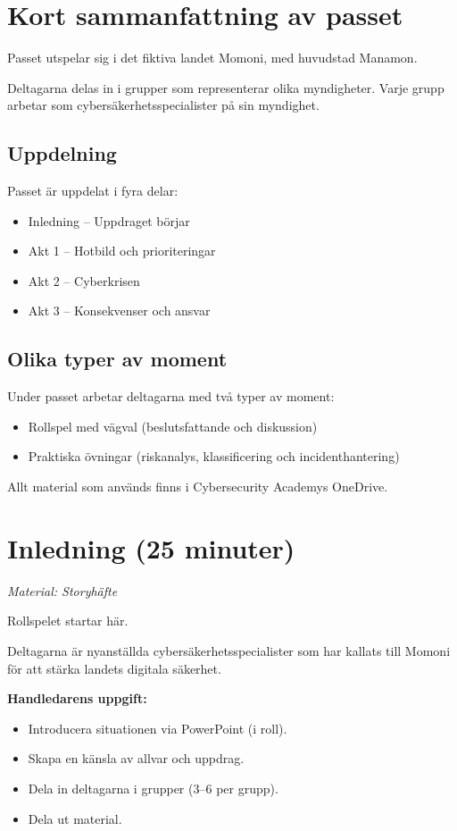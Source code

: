 \documentclass{article}
\begin{document}
\tableofcontents

\section{Kort sammanfattning av passet}
Passet utspelar sig i det fiktiva landet Momoni, med huvudstad Manamon. 

Deltagarna delas in i grupper som representerar olika myndigheter. Varje grupp arbetar som cybersäkerhetsspecialister på sin myndighet. 
\subsection{Uppdelning}
Passet är uppdelat i fyra delar: 
\begin{itemize}
    \item Inledning – Uppdraget börjar 
    \item Akt 1 – Hotbild och prioriteringar 
    \item Akt 2 – Cyberkrisen 
    \item Akt 3 – Konsekvenser och ansvar 
\end{itemize}
\subsection{Olika typer av moment}
Under passet arbetar deltagarna med två typer av moment: 
\begin{itemize}
    \item Rollspel med vägval (beslutsfattande och diskussion) 
    \item Praktiska övningar (riskanalys, klassificering och incidenthantering) 
\end{itemize}
Allt material som används finns i Cybersecurity Academys OneDrive.
\section{Inledning (25 minuter)}
\textit{Material: Storyhäfte}

Rollspelet startar här.

Deltagarna är nyanställda cybersäkerhetsspecialister som har kallats till Momoni för att stärka landets digitala säkerhet.

\textbf{Handledarens uppgift:}
\begin{itemize}
    \item Introducera situationen via PowerPoint (i roll).
    \item Skapa en känsla av allvar och uppdrag.
    \item Dela in deltagarna i grupper (3–6 per grupp).
    \item Dela ut material.
\end{itemize}
\end{document}
